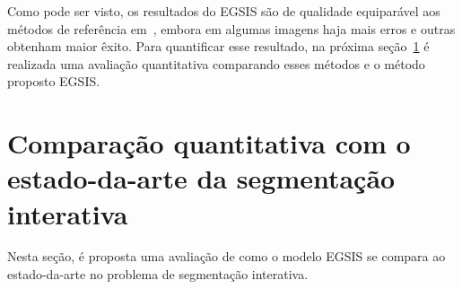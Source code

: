 \begin{figure}[h!]
        \captionsetup{width=11.5cm}
		\centering
\end{figure}
\FloatBarrier{}



Como pode ser visto, os resultados do \gls{EGSIS} são de qualidade
equiparável aos métodos de referência em~, embora em
algumas imagens haja mais erros e outras obtenham maior êxito. Para
quantificar esse resultado, na próxima
seção~\ref{sec:comparacao-estado-da-arte} é realizada uma avaliação
quantitativa comparando esses métodos e o método proposto \gls{EGSIS}.


\section{Comparação quantitativa com o estado-da-arte da segmentação interativa}\label{sec:comparacao-estado-da-arte}

Nesta seção, é proposta uma avaliação de como o modelo \gls{EGSIS} se
compara ao estado-da-arte no problema de segmentação interativa.

